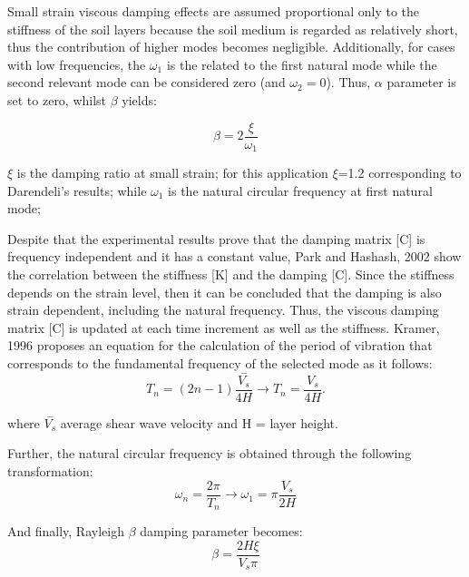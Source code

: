 	Small strain viscous damping effects are assumed proportional only to the stiffness of the soil layers because the soil medium is regarded as relatively short, thus the contribution of higher modes becomes negligible. Additionally, for cases with low frequencies, the $\omega_1$ is the related to the first natural mode while the second relevant mode can be considered zero (and $\omega_2 = 0$). Thus, $\alpha$ parameter is set to zero, whilst $\beta$ yields:
	
	\begin{equation}
	\beta = 2\frac{\xi}{\omega_1}
	\end{equation}
	
	
	$\xi$ is the damping ratio at small strain; for this application $\xi$=1.2 corresponding to Darendeli's results; while $\omega_1$ is the natural circular frequency at first natural mode;
	
	Despite that the experimental results prove that the damping matrix [C] is frequency independent and it has a constant value, Park and Hashash, 2002 \cite{hashash2002viscous} show the correlation between the stiffness [K] and the damping [C]. Since the stiffness depends on the strain level, then it can be concluded that the damping is also strain dependent, including the natural frequency. Thus, the viscous damping matrix [C] is updated at each time increment as well as the stiffness. Kramer, 1996 \cite{kramer1996geotechnical} proposes an equation for the calculation of the period of vibration that corresponds to the fundamental frequency of the selected mode as it follows:
	\begin{equation}
	T_n=(2n-1)\frac{\stackrel{-}{{V}_{s}}}{4H}\longrightarrow T_n=\frac{V_s}{4H}.
	\end{equation}
	
	where $\stackrel{-}{{V}_{s}}$ average shear wave velocity and H = layer height.
	
	Further, the natural circular frequency is obtained through the following transformation:
	\begin{equation}
	\omega_n=\frac{2\pi}{T_n} \rightarrow \omega_1=\pi\frac{V_s}{2H}
	\end{equation}
	
	And finally, Rayleigh $\beta$ damping parameter becomes:
	\begin{equation}
	\beta=\frac{2H\xi}{V_s\pi}
	\end{equation}
	
